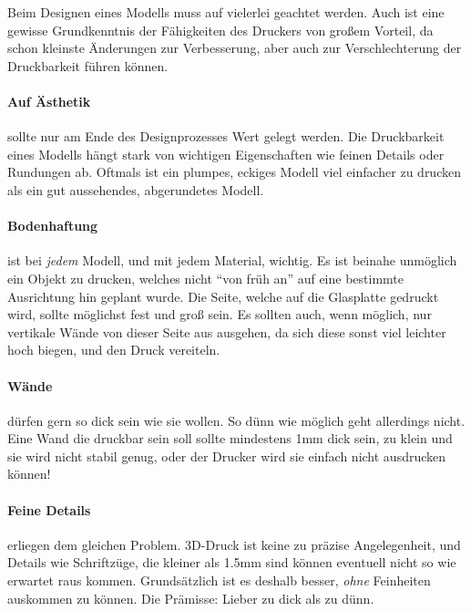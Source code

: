\label{ch:DesignChoices}
Beim Designen eines Modells muss auf vielerlei geachtet werden. Auch ist eine gewisse Grundkenntnis der Fähigkeiten des Druckers von großem Vorteil, da schon kleinste Änderungen zur Verbesserung, aber auch zur Verschlechterung der Druckbarkeit führen können.

\paragraph{Auf Ästhetik} sollte nur am Ende des Designprozesses Wert gelegt werden. Die Druckbarkeit eines Modells hängt stark von wichtigen Eigenschaften wie feinen Details oder Rundungen ab. Oftmals ist ein plumpes, eckiges Modell viel einfacher zu drucken als ein gut aussehendes, abgerundetes Modell.

\paragraph{Bodenhaftung} ist bei \emph{jedem} Modell, und mit jedem Material, wichtig. Es ist beinahe unmöglich ein Objekt zu drucken, welches nicht "`von früh an"' auf eine bestimmte Ausrichtung hin geplant wurde.
Die Seite, welche auf die Glasplatte gedruckt wird, sollte möglichst fest und groß sein. Es sollten auch, wenn möglich, nur vertikale Wände von dieser Seite aus ausgehen, da sich diese sonst viel leichter hoch biegen, und den Druck vereiteln.

\paragraph{Wände} dürfen gern so dick sein wie sie wollen. So dünn wie möglich geht allerdings nicht. Eine Wand die druckbar sein soll sollte mindestens 1mm dick sein, zu klein und sie wird nicht stabil genug, oder der Drucker wird sie einfach nicht ausdrucken können!

\paragraph{Feine Details} erliegen dem gleichen Problem. 3D-Druck ist keine zu präzise Angelegenheit, und Details wie Schriftzüge, die kleiner als 1.5mm sind können eventuell nicht so wie erwartet raus kommen.
Grundsätzlich ist es deshalb besser, \emph{ohne} Feinheiten auskommen zu können. Die Prämisse: Lieber zu dick als zu dünn.

